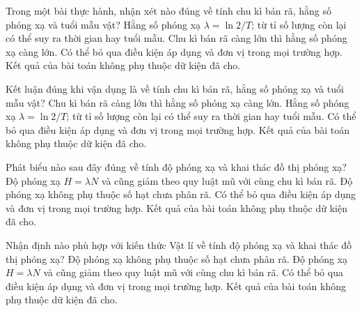 \begin{ex}
Trong một bài thực hành, nhận xét nào đúng về tính chu kì bán rã, hằng số phóng xạ và tuổi mẫu vật?
\choice
{\True Hằng số phóng xạ $\lambda=\ln2/T$; từ tỉ số lượng còn lại có thể suy ra thời gian hay tuổi mẫu.}
{Chu kì bán rã càng lớn thì hằng số phóng xạ càng lớn.}
{Có thể bỏ qua điều kiện áp dụng và đơn vị trong mọi trường hợp.}
{Kết quả của bài toán không phụ thuộc dữ kiện đã cho.}
\end{ex}

\begin{ex}
Kết luận đúng khi vận dụng là về tính chu kì bán rã, hằng số phóng xạ và tuổi mẫu vật?
\choice
{Chu kì bán rã càng lớn thì hằng số phóng xạ càng lớn.}
{\True Hằng số phóng xạ $\lambda=\ln2/T$; từ tỉ số lượng còn lại có thể suy ra thời gian hay tuổi mẫu.}
{Có thể bỏ qua điều kiện áp dụng và đơn vị trong mọi trường hợp.}
{Kết quả của bài toán không phụ thuộc dữ kiện đã cho.}
\end{ex}

\begin{ex}
Phát biểu nào sau đây đúng về tính độ phóng xạ và khai thác đồ thị phóng xạ?
\choice
{\True Độ phóng xạ $H=\lambda N$ và cũng giảm theo quy luật mũ với cùng chu kì bán rã.}
{Độ phóng xạ không phụ thuộc số hạt chưa phân rã.}
{Có thể bỏ qua điều kiện áp dụng và đơn vị trong mọi trường hợp.}
{Kết quả của bài toán không phụ thuộc dữ kiện đã cho.}
\end{ex}

\begin{ex}
Nhận định nào phù hợp với kiến thức Vật lí về tính độ phóng xạ và khai thác đồ thị phóng xạ?
\choice
{Độ phóng xạ không phụ thuộc số hạt chưa phân rã.}
{\True Độ phóng xạ $H=\lambda N$ và cũng giảm theo quy luật mũ với cùng chu kì bán rã.}
{Có thể bỏ qua điều kiện áp dụng và đơn vị trong mọi trường hợp.}
{Kết quả của bài toán không phụ thuộc dữ kiện đã cho.}
\end{ex}

